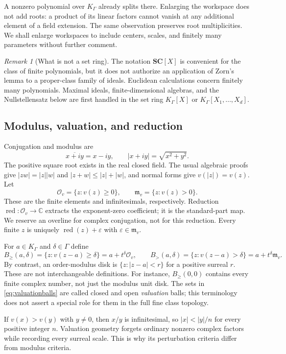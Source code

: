 \documentclass[11pt,letterpaper]{article}
\numberwithin{equation}{section}
\theoremstyle{definition}
\theoremstyle{remark}
\newtheorem{remark}[remark]{Remark}
\newcommand{\SC}{\mathbf{SC}}
\newcommand{\C}{\mathbb C}
\newcommand{\Ov}{\mathcal O_v}
\newcommand{\mv}{\mathfrak m_v}
\newcommand{\red}{\operatorname{red}}
\newcommand{\Bge}[2]{B_{\ge}(#1,#2)}
\newcommand{\Bgt}[2]{B_{>}(#1,#2)}
\begin{document}
A nonzero polynomial over $K_\Gamma$ already splits there. Enlarging the
workspace does not add roots: a product of its linear factors cannot
vanish at any additional element of a field extension. The same observation
preserves root multiplicities. We shall enlarge workspaces to include
centers, scales, and finitely many parameters without further comment.

\begin{remark}[What is not a set ring]
The notation $\SC[X]$ is convenient for the class of finite polynomials,
but it does not authorize an application of Zorn's lemma to a proper-class
family of ideals. Euclidean calculations concern finitely many
polynomials. Maximal ideals, finite-dimensional algebras, and the
Nullstellensatz below are first handled in the set ring $K_\Gamma[X]$ or
$K_\Gamma[X_1,\ldots,X_d]$.
\end{remark}

\subsection{Modulus, valuation, and reduction}
Conjugation and modulus are
\[
 \overline{x+iy}=x-iy,\qquad |x+iy|=\sqrt{x^2+y^2}.
\]
The positive square root exists in the real closed field. The usual
algebraic proofs give $|zw|=|z||w|$ and $|z+w|\le|z|+|w|$, and normal forms
give $v(|z|)=v(z)$. Let
\[
 \Ov=\{z:v(z)\ge0\},\qquad \mv=\{z:v(z)>0\}.
\]
These are the finite elements and infinitesimals, respectively. Reduction
$\red:\Ov\to\C$ extracts the exponent-zero coefficient; it is the
standard-part map. We reserve an overline for complex conjugation, not for
this reduction. Every finite $z$ is uniquely $\red(z)+\varepsilon$ with
$\varepsilon\in\mv$.

For $a\in K_\Gamma$ and $\delta\in\Gamma$ define
\begin{equation}\label{eq:valuationballs}
 \Bge{a}{\delta}=\{z:v(z-a)\ge\delta\}=a+t^\delta\Ov,
 \qquad
 \Bgt{a}{\delta}=\{z:v(z-a)>\delta\}=a+t^\delta\mv.
\end{equation}
By contrast, an order-modulus disk is $\{z:|z-a|<r\}$ for a positive surreal
$r$. These are not interchangeable definitions. For instance,
$\Bge{0}{0}$ contains every finite complex number, not just the modulus unit
disk. The sets in \eqref{eq:valuationballs} are called closed and open
\emph{valuation} balls; this terminology does not assert a special role for
them in the full fine class topology.

If $v(x)>v(y)$ with $y\ne0$, then $x/y$ is infinitesimal, so $|x|<|y|/n$
for every positive integer $n$. Valuation geometry forgets ordinary
nonzero complex factors while recording every surreal scale. This is why
its perturbation criteria differ from modulus criteria.
\end{document}
